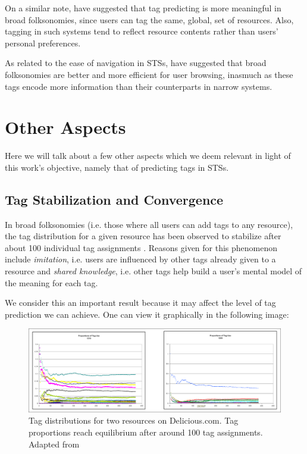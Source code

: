On a similar note, \cite{aiello_2012} have suggested that tag predicting is more meaningful in broad folksonomies, since users can tag the same, global, set of resources. Also, tagging in such systems tend to reflect resource contents rather than users' personal preferences.

As related to the ease of navigation in STSs, \cite{helic_etal_2012} have suggested that broad folksonomies are better and more efficient for user browsing, inasmuch as these tags encode more information than their counterparts in narrow systems.

\section{Other Aspects}

Here we will talk about a few other aspects which we deem relevant in light of this work's objective, namely that of predicting tags in STSs.

\subsection{Tag Stabilization and Convergence}

In broad folksonomies (i.e. those where all users can add tags to any resource), the tag distribution for a given resource has been observed to stabilize after about 100 individual tag assignments \citep{golder_huberman_2006}. Reasons given for this phenomenon include \textit{imitation}, i.e. users are influenced by other tags already given to a resource and \textit{shared knowledge}, i.e. other tags help build a user's mental model of the meaning for each tag.

We consider this an important result because it may affect the level of tag prediction we can achieve. One can view it graphically in the following image:

\begin{figure}[H]
    \centering
    \includegraphics[width=\textwidth]{chapters/02_social_tagging/images/golder_huberman.png}
    \caption{Tag distributions for two resources on Delicious.com. Tag proportions reach equilibrium after around 100 tag assignments. Adapted from \cite{golder_huberman_2005}}
    \label{fig:golder_huberman}
\end{figure}

